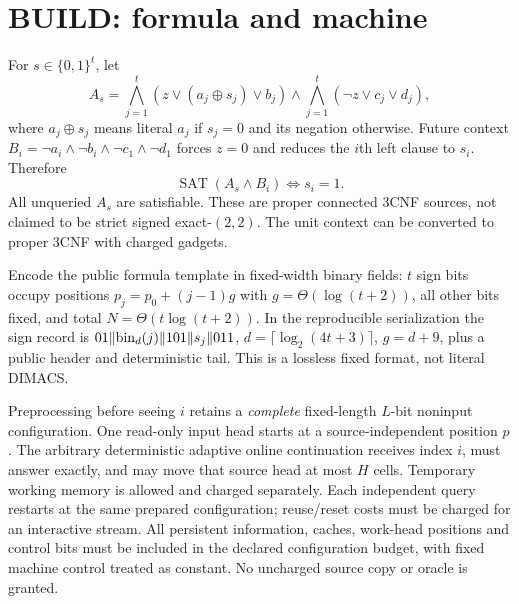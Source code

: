 \documentclass[11pt]{article}
\begin{document}
\section{BUILD: formula and machine}
For $s\in\{0,1\}^t$, let
\[
 A_s=\bigwedge_{j=1}^t(z\vee(a_j\oplus s_j)\vee b_j)
 \land\bigwedge_{j=1}^t(\neg z\vee c_j\vee d_j),
\]
where $a_j\oplus s_j$ means literal $a_j$ if $s_j=0$ and its negation otherwise. Future context
$B_i=\neg a_i\land\neg b_i\land\neg c_1\land\neg d_1$ forces $z=0$ and reduces the $i$th left clause to $s_i$. Therefore
\[
\operatorname{SAT}(A_s\land B_i)\iff s_i=1.
\]
All unqueried $A_s$ are satisfiable. These are proper connected 3CNF sources, not claimed to be strict signed exact-$(2,2)$. The unit context can be converted to proper 3CNF with charged gadgets.

Encode the public formula template in fixed-width binary fields: $t$ sign bits occupy positions $p_j=p_0+(j-1)g$ with $g=\Theta(\log(t+2))$, all other bits fixed, and total $N=\Theta(t\log(t+2))$. In the reproducible serialization the sign record is $01\Vert{\rm bin}_d(j)\Vert101\Vert s_j\Vert011$, $d=\lceil\log_2(4t+3)\rceil$, $g=d+9$, plus a public header and deterministic tail. This is a lossless fixed format, not literal DIMACS.

Preprocessing before seeing $i$ retains a \emph{complete} fixed-length $L$-bit noninput configuration. One read-only input head starts at a source-independent position $p$. The arbitrary deterministic adaptive online continuation receives index $i$, must answer exactly, and may move that source head at most $H$ cells. Temporary working memory is allowed and charged separately. Each independent query restarts at the same prepared configuration; reuse/reset costs must be charged for an interactive stream. All persistent information, caches, work-head positions and control bits must be included in the declared configuration budget, with fixed machine control treated as constant. No uncharged source copy or oracle is granted.
\end{document}
